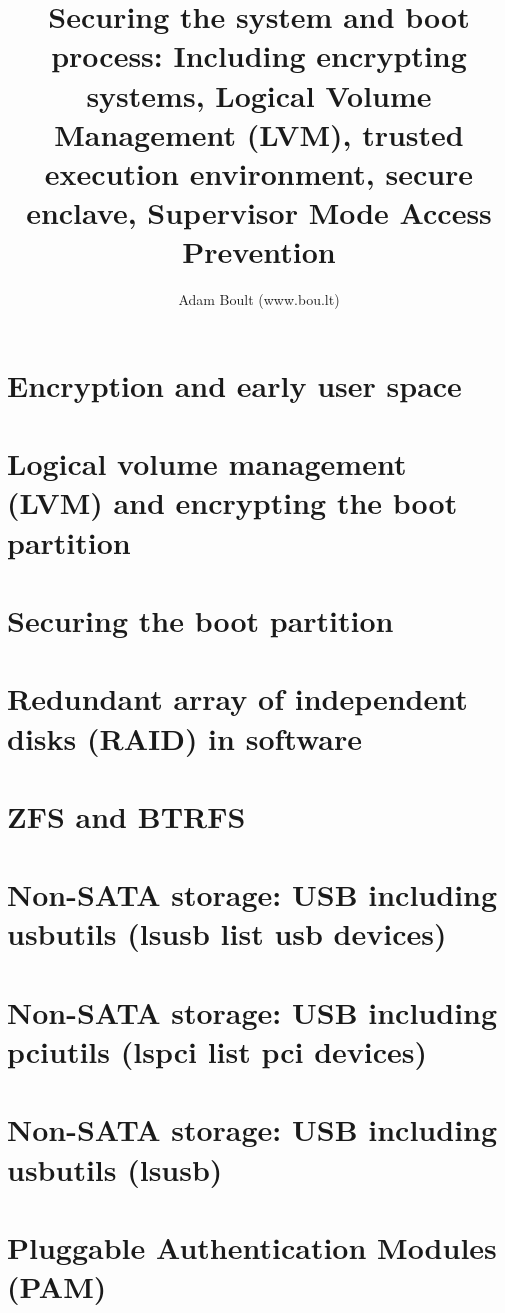 \documentclass[oneside]{book}
\begin{document}
\author{Adam Boult (www.bou.lt)}
\title{Securing the system and boot process: Including encrypting systems, Logical Volume Management (LVM), trusted execution environment, secure enclave, Supervisor Mode Access Prevention}
\maketitle

\setcounter{tocdepth}{0}
\tableofcontents



\part{Encryption and early user space}




\part{Logical volume management (LVM) and encrypting the boot partition}


\part{Securing the boot partition}



\part{Redundant array of independent disks (RAID) in software}


\part{ZFS and BTRFS}



\part{Non-SATA storage: USB including usbutils (lsusb list usb devices)}
\part{Non-SATA storage: USB including pciutils (lspci list pci devices)}
\part{Non-SATA storage: USB including usbutils (lsusb)}


\part{Pluggable Authentication Modules (PAM)}

\end{document}
